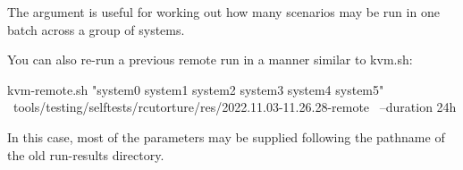 The   argument is useful for working out
how many scenarios may be run in one batch across a group of systems.

You can also re-run a previous remote run in a manner similar to kvm.sh:

\begin{VerbatimU}
	kvm-remote.sh "system0 system1 system2 system3 system4 system5" \
	    tools/testing/selftests/rcutorture/res/2022.11.03-11.26.28-remote \
	    --duration 24h
\end{VerbatimU}

In this case, most of the  parameters may be supplied following
the pathname of the old run-results directory.
